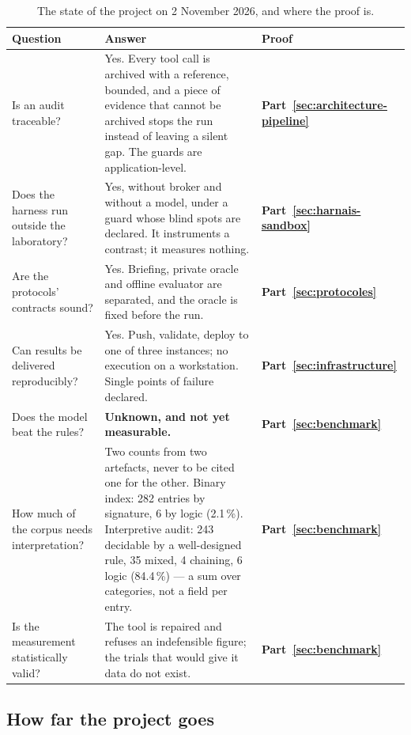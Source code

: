 \begin{table}[H]
\centering
\caption{The state of the project on 2 November 2026, and where the proof is.}
\label{tab:etat-chiffre}
\small
\begin{tabularx}{\linewidth}{@{}p{3.9cm}Yp{2.6cm}@{}}
\toprule
Question & Answer & \textbf{Proof} \\
\midrule
Is an audit traceable? & Yes. Every tool call is archived with a reference,
bounded, and a piece of evidence that cannot be archived stops the run instead of
leaving a silent gap. The guards are application-level. & \textbf{Part~\ref{sec:architecture-pipeline}} \\
Does the harness run outside the laboratory? & Yes, without broker and without a
model, under a guard whose blind spots are declared. It instruments a contrast; it
measures nothing. & \textbf{Part~\ref{sec:harnais-sandbox}} \\
Are the protocols' contracts sound? & Yes. Briefing, private oracle and offline
evaluator are separated, and the oracle is fixed before the run. & \textbf{Part~\ref{sec:protocoles}} \\
Can results be delivered reproducibly? & Yes. Push, validate, deploy to one of
three instances; no execution on a workstation. Single points of failure declared.
& \textbf{Part~\ref{sec:infrastructure}} \\
Does the model beat the rules? & \textbf{Unknown, and not yet measurable.} & \textbf{Part~\ref{sec:benchmark}} \\
How much of the corpus needs interpretation? & Two counts from two artefacts,
never to be cited one for the other. Binary index: 282 entries by signature, 6 by
logic (2.1\,\%). Interpretive audit: 243 decidable by a well-designed rule, 35
mixed, 4 chaining, 6 logic (84.4\,\%) --- a sum over categories, not a field
per entry. & \textbf{Part~\ref{sec:benchmark}} \\
Is the measurement statistically valid? & The tool is repaired and refuses an
indefensible figure; the trials that would give it data do not exist. & \textbf{Part~\ref{sec:benchmark}} \\
\bottomrule
\end{tabularx}
\end{table}

\subsection{How far the project goes}
\label{sec:jusquou}

